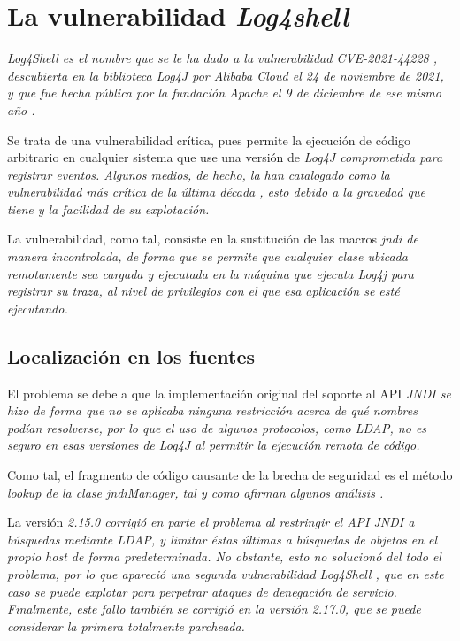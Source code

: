 \documentclass[../main.tex]{subfiles}
\begin{document}
\section{La vulnerabilidad \it{Log4shell}}

\it{Log4Shell} es el nombre que se le ha dado a la vulnerabilidad \it{CVE-2021-44228} \cite{cve-log4shell}, descubierta en la biblioteca \it{Log4J} por \it{Alibaba Cloud} el 24 de noviembre de 2021, y que fue hecha pública por la fundación \it{Apache} el 9 de diciembre de ese mismo año \cite{log4j-vulnerabilities}.

Se trata de una vulnerabilidad crítica, pues permite la ejecución de código arbitrario en cualquier sistema que use una versión de \it{Log4J} comprometida para registrar eventos. Algunos medios, de hecho, la han catalogado como la vulnerabilidad más crítica de la última década \cite{log4shell-noticia}, esto debido a la gravedad que tiene y la facilidad de su explotación.

La vulnerabilidad, como tal, consiste en la sustitución de las macros \it{jndi} de manera incontrolada, de forma que se permite que cualquier clase ubicada remotamente sea cargada y ejecutada en la máquina que ejecuta \it{Log4j} para registrar su traza, al nivel de privilegios con el que esa aplicación se esté ejecutando.

\subsection{Localización en los fuentes}

El problema se debe a que la implementación original del soporte al API \it{JNDI} se hizo de forma que no se aplicaba ninguna restricción acerca de qué nombres podían resolverse, por lo que el uso de algunos protocolos, como \it{LDAP}, no es seguro en esas versiones de \it{Log4J} al permitir la ejecución remota de código.

Como tal, el fragmento de código causante de la brecha de seguridad es el método \it{lookup} de la clase \it{jndiManager}, tal y como afirman algunos análisis \cite{log4shell-cause-sophos}.

La versión \it{2.15.0} corrigió en parte el problema al restringir el API \it{JNDI} a búsquedas mediante \it{LDAP}, y limitar éstas últimas a búsquedas de objetos en el propio host de forma predeterminada. No obstante, esto no solucionó del todo el problema, por lo que apareció una segunda vulnerabilidad \it{Log4Shell} \cite{cve-log4shell-2}, que en este caso se puede explotar para perpetrar ataques de denegación de servicio. Finalmente, este fallo también se corrigió en la versión \it{2.17.0}, que se puede considerar la primera totalmente parcheada.
\end{document}
